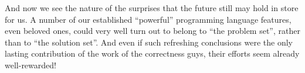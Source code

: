\documentclass[12pt,letterpaper]{article}
\begin{document}
And now we see the nature of the surprises that the future still may hold in
store for us. A number of our established ``powerful'' programming language
features, even beloved ones, could very well turn out to belong to ``the problem
set'', rather than to ``the solution set''. And even if such refreshing
conclusions were the only lasting contribution of the work of the correctness
guys, their efforts seem already well-rewarded! 
\end{document}
